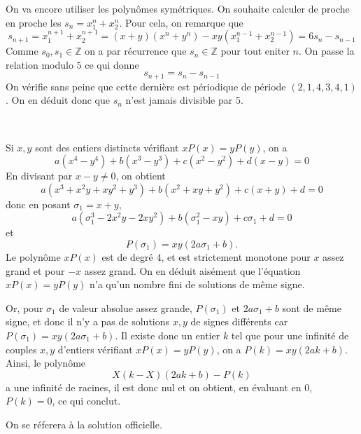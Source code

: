 \begin{sol}

On va encore utiliser les polynômes symétriques. On souhaite calculer de proche en proche les $s_n=x_1^n+x_2^n$. Pour cela, on remarque que 
$$s_{n+1}=x_1^{n+1}+x_2^{n+1}=(x+y)(x^n+y^n)-xy(x_1^{n-1}+x_2^{n-1})=6s_n-s_{n-1} $$
Comme $s_0,s_1\in \mathbb{Z}$ on a par récurrence que $s_n\in \mathbb{Z}$ pour tout eniter $n$. On passe la relation modulo $5$ ce qui donne 
$$s_{n+1}=s_n-s_{n-1} $$
On vérifie sans peine que cette dernière est périodique de période $(2,1,4,3,4,1)$. On en déduit donc que $s_n$ n'est jamais divisible par $5$.






\end{sol}

\\
\begin{sol}
Si $x,y$ sont des entiers distincts vérifiant $xP(x)=yP(y)$, on a
$$a(x^4-y^4)+b(x^3-y^3)+c(x^2-y^2)+d(x-y)=0$$
En divisant par $x-y\ne 0$, on obtient
$$a(x^3+x^2y+xy^2+y^3)+b(x^2+xy+y^2)+c(x+y)+d=0$$
donc en posant $\sigma_1=x+y$,
$$a(\sigma_1^3-2x^2y-2xy^2)+b(\sigma_1^2-xy)+c\sigma_1+d=0$$
et
$$P(\sigma_1)=xy(2a\sigma_1+b).$$
Le polynôme $xP(x)$ est de degré $4$, et est strictement monotone pour $x$ assez grand et pour $-x$ assez grand. On en déduit aisément que l'équation $xP(x)=yP(y)$ n'a qu'un nombre fini de solutions de même signe.

Or, pour $\sigma_1$ de valeur absolue assez grande, $P(\sigma_1)$ et $2a\sigma_1+b$ sont de même signe, et donc il n'y a pas de solutions $x,y$ de signes différents car $P(\sigma_1)=xy(2a\sigma_1+b)$. Il existe donc un entier $k$ tel que pour une infinité de couples $x,y$ d'entiers vérifiant $xP(x)=yP(y)$, on a $P(k)=xy(2ak+b)$. Ainsi, le polynôme
$$X(k-X)(2ak+b)-P(k)$$
a une infinité de racines, il est donc nul et on obtient, en évaluant en $0$, $P(k)=0$, ce qui conclut.
\end{sol}
\begin{sol}
On se réferera à la solution officielle.
\end{sol}
